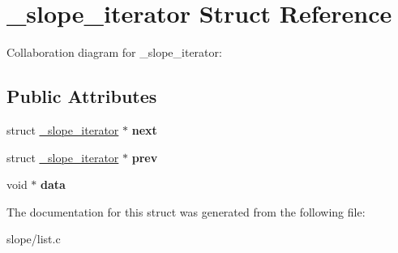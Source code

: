 \hypertarget{struct__slope__iterator}{\section{\+\_\+slope\+\_\+iterator Struct Reference}
\label{struct__slope__iterator}
}


Collaboration diagram for \+\_\+slope\+\_\+iterator\+:
\subsection*{Public Attributes}
\begin{DoxyCompactItemize}
\item 
\hypertarget{struct__slope__iterator_a2e350fc606387696fa30b8bf28f65b81}{struct \hyperlink{struct__slope__iterator}{\+\_\+slope\+\_\+iterator} $\ast$ {\bfseries next}}\label{struct__slope__iterator_a2e350fc606387696fa30b8bf28f65b81}

\item 
\hypertarget{struct__slope__iterator_ad1f3246238c01985972820139a2729dd}{struct \hyperlink{struct__slope__iterator}{\+\_\+slope\+\_\+iterator} $\ast$ {\bfseries prev}}\label{struct__slope__iterator_ad1f3246238c01985972820139a2729dd}

\item 
\hypertarget{struct__slope__iterator_af9a1a22abb8ffc7b7a67cdf58be7aa6f}{void $\ast$ {\bfseries data}}\label{struct__slope__iterator_af9a1a22abb8ffc7b7a67cdf58be7aa6f}

\end{DoxyCompactItemize}


The documentation for this struct was generated from the following file\+:\begin{DoxyCompactItemize}
\item 
slope/list.\+c\end{DoxyCompactItemize}
